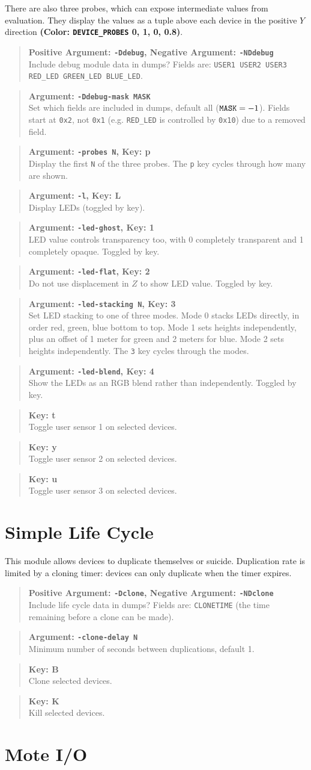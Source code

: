 \documentclass{article}
\newcommand\var[1]{{\tt #1}}
\newcommand\key[1]{{\bf #1}}
\newcommand\simarg[2]{\begin{quote} {\bf Argument: \var{#1}} \\ #2 \end{quote}}
\newcommand\simkey[2]{\begin{quote} {\bf Key: \key{#1}} \\ #2 \end{quote}}
\newcommand\simargkey[3]{
  \begin{quote} {\bf Argument: \var{#1}, Key: \key{#2}} \\ #3 \end{quote}
}
\newcommand\simPMarg[3]{
  \begin{quote}
    {\bf Positive Argument: \var{#1}, Negative Argument: \var{#2}} \\ #3
  \end{quote}
}
\newcommand\color[5]{{\bf (Color: {\tt #1} #2, #3, #4, #5)}} %
\begin{document}
There are also three probes, which can expose intermediate values from
evaluation.  They display the values as a tuple above each device in
the positive $Y$ direction \color{DEVICE\_PROBES}{0}{1}{0}{0.8}.

\simPMarg{-Ddebug}{-NDdebug}{Include debug module data in dumps?
  Fields are: \var{USER1 USER2 USER3 RED\_LED GREEN\_LED BLUE\_LED}.}
\simarg{-Ddebug-mask MASK}{Set which fields are included in dumps,
  default all ($\var{MASK}=-1$).  Fields start at \var{0x2}, not
  \var{0x1} (e.g. \var{RED\_LED} is controlled by \var{0x10}) due to a
  removed field.}
\simargkey{-probes N}{p}{Display the first \var{N} of the three probes.  
  The \var{p} key cycles through how many are shown.}
\simargkey{-l}{L}{Display LEDs (toggled by key).}
\simargkey{-led-ghost}{1}{LED value controls transparency too, with 0
  completely transparent and 1 completely opaque.  Toggled by key.}
\simargkey{-led-flat}{2}{Do not use displacement in $Z$ to show LED value.
  Toggled by key.}
\simargkey{-led-stacking N}{3}{Set LED stacking to one of three modes.
  Mode 0 stacks LEDs directly, in order red, green, blue bottom to top. 
  Mode 1 sets heights independently, plus an offset of 1 meter for green 
  and 2 meters for blue.  Mode 2 sets heights independently.  The \var{3} key
  cycles through the modes.}
\simargkey{-led-blend}{4}{Show the LEDs as an RGB blend rather than 
  independently.  Toggled by key.}
\simkey{t}{Toggle user sensor 1 on selected devices.}
\simkey{y}{Toggle user sensor 2 on selected devices.}
\simkey{u}{Toggle user sensor 3 on selected devices.}


\section{Simple Life Cycle}

This module allows devices to duplicate themselves or suicide.
Duplication rate is limited by a cloning timer: devices can only
duplicate when the timer expires.

\simPMarg{-Dclone}{-NDclone}{Include life cycle data in dumps?
  Fields are: \var{CLONETIME} (the time remaining before a clone can be made).}
\simarg{-clone-delay N}{Minimum number of seconds between duplications,
  default 1.}
\simkey{B}{Clone selected devices.}
\simkey{K}{Kill selected devices.}


\section{Mote I/O}
\end{document}
